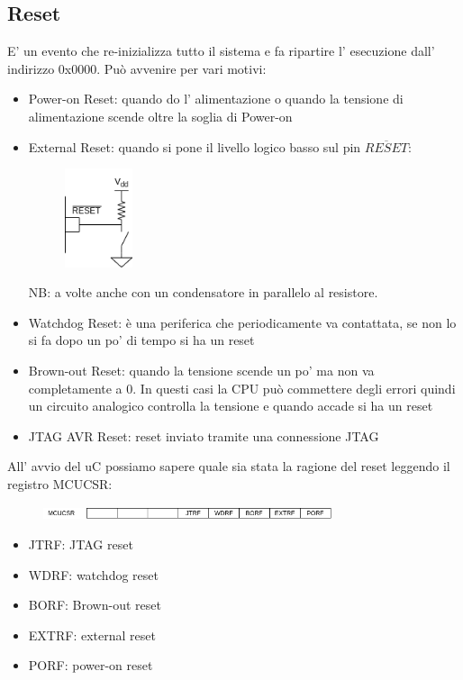 \subsection{Reset}
E' un evento che re-inizializza tutto il sistema e fa ripartire l' esecuzione dall' indirizzo 0x0000.
Può avvenire per vari motivi:
\begin{itemize}
    \item Power-on Reset: quando do l' alimentazione o quando la tensione di alimentazione scende oltre la soglia di Power-on
    \item External Reset: quando si pone il livello logico basso sul pin $\overline{RESET}$:
    \begin{figure}[H]
        \centering
        \includegraphics[width=75px]{images/16_Sleep_mode/reset_push_button.png}
    \end{figure}
    NB: a volte anche con un condensatore in parallelo al resistore.
    
    \item Watchdog Reset: è una periferica che periodicamente va contattata, se non lo si fa dopo un po' di tempo si ha un reset
    \item Brown-out Reset: quando la tensione scende un po' ma non va completamente a 0.
    In questi casi la CPU può commettere degli errori quindi un circuito analogico controlla la tensione e quando accade si ha un reset
    \item JTAG AVR Reset: reset inviato tramite una connessione JTAG
\end{itemize}

All' avvio del uC possiamo sapere quale sia stata la ragione del reset leggendo il registro MCUCSR:
\begin{figure}[H]
    \centering
    \includegraphics[width=320px]{images/16_Sleep_mode/MCUCSR.png}
\end{figure}
\begin{itemize}
    \item JTRF: JTAG reset
    \item WDRF: watchdog reset
    \item BORF: Brown-out reset
    \item EXTRF: external reset
    \item PORF: power-on reset
\end{itemize}
